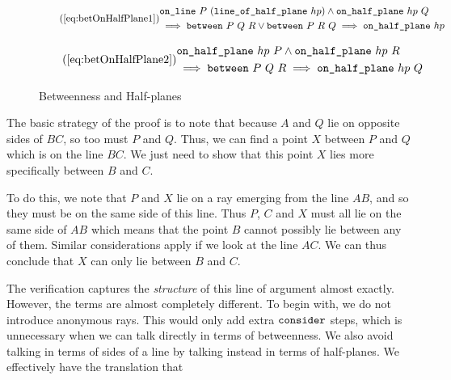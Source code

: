 \begin{figure}
\begin{equation}\tag{\ref{eq:betOnHalfPlane1}}
  \begin{split}
    &\code{on\_line}\ P\ (\code{line\_of\_half\_plane}\ hp) \wedge \code{on\_half\_plane}\ hp\ Q\\
    &\implies \between{P}{Q}{R} \vee \between{P}{R}{Q} \implies \code{on\_half\_plane}\ hp
  \end{split}
\end{equation}

\begin{equation}\tag{\ref{eq:betOnHalfPlane2}}
  \begin{split}
    &\code{on\_half\_plane}\ hp\ P \wedge \code{on\_half\_plane}\ hp\ R\\
    &\implies \between{P}{Q}{R} \implies \code{on\_half\_plane}\ hp\ Q
  \end{split}
\end{equation}
\caption{Betweenness and Half-planes}
\label{fig:BetOnHalfPlaneTheorems}
\end{figure}

The basic strategy of the proof is to note that because $A$ and $Q$ lie on opposite sides of $BC$, so too must $P$ and $Q$. Thus, we can find a point $X$ between $P$ and $Q$ which is on the line $BC$. We just need to show that this point $X$ lies more specifically between $B$ and $C$.

To do this, we note that $P$ and $X$ lie on a ray emerging from the line $AB$, and so they must be on the same side of this line. Thus $P$, $C$ and $X$ must all lie on the same side of $AB$ which means that the point $B$ cannot possibly lie between any of them. Similar considerations apply if we look at the line $AC$. We can thus conclude that $X$ can only lie between $B$ and $C$.

The verification captures the \emph{structure} of this line of argument almost exactly. However, the terms are almost completely different. To begin with, we do not introduce anonymous rays. This would only add extra $\texttt{consider}$ steps, which is unnecessary when we can talk directly in terms of betweenness. We also avoid talking in terms of sides of a line by talking instead in terms of half-planes. We effectively have the translation that

